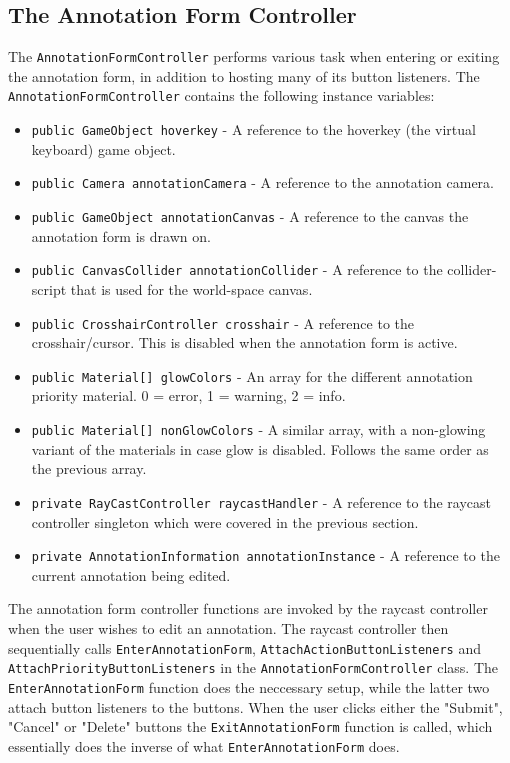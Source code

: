 \subsection{The Annotation Form Controller}
The \texttt{AnnotationFormController} performs various task when entering or exiting the annotation form, in addition to hosting many of its button listeners.
The \texttt{AnnotationFormController} contains the following instance variables:

\begin{itemize}
    \item \texttt{public GameObject hoverkey} - A reference to the hoverkey (the virtual keyboard) game object.
    \item \texttt{public Camera annotationCamera} - A reference to the annotation camera.
    \item \texttt{public GameObject annotationCanvas} - A reference to the canvas the annotation form is drawn on.
    \item \texttt{public CanvasCollider annotationCollider} - A reference to the collider-script that is used for the world-space canvas. 
    \item \texttt{public CrosshairController crosshair} - A reference to the crosshair/cursor. This is disabled when the annotation form is active.
    \item \texttt{public Material[] glowColors} - An array for the different annotation priority material.  0 = error, 1 = warning, 2 = info.
    \item \texttt{public Material[] nonGlowColors} - A similar array, with a non-glowing variant of the materials in case glow is disabled. Follows the same order as the previous array.
    \item \texttt{private RayCastController raycastHandler} - A reference to the raycast controller singleton which were covered in the previous section.
    \item \texttt{private AnnotationInformation annotationInstance} - A reference to the current annotation being edited.
\end{itemize}

The annotation form controller functions are invoked by the raycast controller when the user wishes to edit an annotation. 
The raycast controller then sequentially calls \texttt{EnterAnnotationForm}, \texttt{AttachActionButtonListeners} and 
\texttt{AttachPriorityButtonListeners} in the \texttt{AnnotationFormController} class. The \texttt{EnterAnnotationForm} function
does the neccessary setup, while the latter two attach button listeners to the buttons. When the user clicks either the 
"Submit", "Cancel" or "Delete" buttons the \texttt{ExitAnnotationForm} function is called, which essentially does the inverse
of what \texttt{EnterAnnotationForm} does. 

